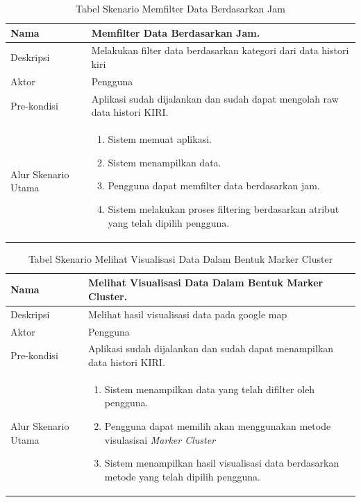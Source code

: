 \begin{table}[H]
    \centering
    \caption{Tabel Skenario Memfilter Data Berdasarkan Jam }
    \begin{tabular}{|p{3cm}|p{10cm}|}
    \hline
        Nama & Memfilter Data Berdasarkan Jam.\\
    \hline
    \hline
        Deskripsi & Melakukan filter data berdasarkan kategori dari data histori kiri \\
    \hline
        Aktor & Pengguna \\
    \hline
        Pre-kondisi & Aplikasi sudah dijalankan dan sudah dapat mengolah raw data histori KIRI.\\
    \hline
        Alur Skenario Utama & 
        \begin{enumerate}
            \item Sistem memuat aplikasi.
            \item Sistem menampilkan data.
            \item Pengguna  dapat memfilter data berdasarkan jam.
            \item Sistem melakukan proses filtering berdasarkan atribut yang telah dipilih pengguna.
        \end{enumerate}\\
    \hline
    \end{tabular}
    \label{tab:skenario1}
\end{table}

\begin{table}[H]
    \centering
    \caption{Tabel Skenario Melihat Visualisasi Data Dalam Bentuk Marker Cluster }
    \begin{tabular}{|p{3cm}|p{10cm}|}
    \hline
        Nama & Melihat Visualisasi Data Dalam Bentuk Marker Cluster.\\
    \hline
    \hline
        Deskripsi & Melihat hasil visualisasi data pada google map  \\
    \hline
        Aktor & Pengguna \\
    \hline
        Pre-kondisi & Aplikasi sudah dijalankan dan sudah dapat menampilkan data histori KIRI.\\
    \hline
        Alur Skenario Utama & 
        \begin{enumerate}
            \item Sistem menampilkan data yang telah difilter oleh pengguna.
             \item Pengguna  dapat memilih akan menggunakan metode visulasisai \textit{Marker Cluster} 
            \item Sistem menampilkan hasil visualisasi data berdasarkan metode yang telah dipilih pengguna.
        \end{enumerate}\\
    \hline
    \end{tabular}
    \label{tab:skenario1}
\end{table}

